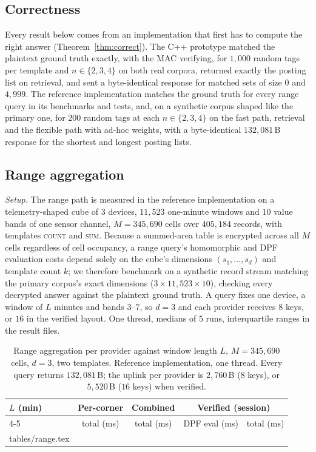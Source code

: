 \documentclass[a4paper,fleqn]{cas-sc}
\begin{document}
\subsection{Correctness}
\label{sec:correctness}
Every result below comes from an implementation that first has to compute the
right answer (Theorem~\ref{thm:correct}). The C++ prototype matched the plaintext ground truth exactly, with
the MAC verifying, for $1{,}000$ random tags per template and $n\in\{2,3,4\}$ on
both real corpora, returned exactly the posting list on retrieval, and sent a
byte-identical response for matched sets of size $0$ and $4{,}999$. The
reference implementation matches the ground truth for every range query in its
benchmarks and tests, and, on a synthetic corpus shaped like the primary one,
for $200$ random tags at each $n\in\{2,3,4\}$ on the fast path, retrieval and
the flexible path with ad-hoc weights, with a byte-identical $132{,}081$\,B
response for the shortest and longest posting lists.


\subsection{Range aggregation}
\label{sec:rangeresult}
\emph{Setup.} The range path is measured in the reference implementation on a
telemetry-shaped cube of $3$ devices, $11{,}523$ one-minute windows and $10$
value bands of one sensor channel, $M=345{,}690$ cells over $405{,}184$
records, with templates \textsc{count} and \textsc{sum}. Because a summed-area table is encrypted across all $M$ cells regardless
of cell occupancy, a range query's homomorphic and DPF evaluation costs
depend solely on the cube's dimensions $(s_1,\dots,s_d)$ and template count
$k$; we therefore benchmark on a synthetic record stream matching the primary
corpus's exact dimensions ($3\times 11{,}523\times 10$), checking every
decrypted answer against the plaintext ground truth. A query fixes one device, a window of $L$ minutes and bands $3$--$7$,
so $d=3$ and each provider receives $8$ keys, or $16$ in the verified layout.
One thread, medians of $5$ runs, interquartile ranges in the result files.

\begin{table}[pos=htbp]
\caption{Range aggregation per provider against window length $L$,
$M=345{,}690$ cells, $d=3$, two templates. Reference implementation, one
thread. Every query returns $132{,}081$\,B; the uplink per provider is
$2{,}760$\,B ($8$ keys), or $5{,}520$\,B ($16$ keys) when verified.}
\label{tab:range}
\centering
\footnotesize
\begin{tabular*}{\tblwidth}{@{\extracolsep{\fill}}lcccc@{}}
\toprule
$L$ (min) & Per-corner & Combined & \multicolumn{2}{c}{Verified (session)} \\
\cmidrule(lr){4-5}
 & total (ms) & total (ms) & DPF eval (ms) & total (ms) \\
\midrule
{} tables/range.tex 
\bottomrule
\end{tabular*}
\end{table}
\end{document}
